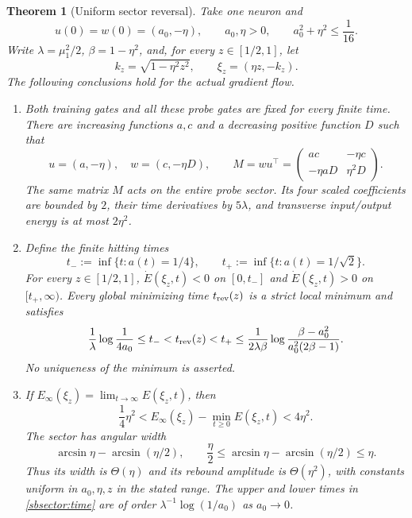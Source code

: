 \documentclass[10pt]{article}
\newtheorem{theorem}{Theorem}[section]
\theoremstyle{remark}\newtheorem{remark}[theorem]{Remark}
\begin{document}
\begin{theorem}[Uniform sector reversal]
\label{sbsector:theorem}
Take one neuron and
\[
 u(0)=w(0)=(a_0,-\eta),\qquad
 a_0,\eta>0,\qquad a_0^2+\eta^2\le\frac1{16}.
\]
Write $\lambda=\mu_1^2/2$, $\beta=1-\eta^2$, and, for every
$z\in[1/2,1]$, let
\[
 k_z=\sqrt{1-\eta^2z^2},\qquad \xi_z=(\eta z,-k_z).
\]
The following conclusions hold for the actual gradient flow.
\begin{enumerate}[label=(\roman*)]
\item Both training gates and all these probe gates are fixed for every
finite time. There are increasing functions $a,c$ and a decreasing
positive function $D$ such that
\[
 u=(a,-\eta),\quad w=(c,-\eta D),\qquad
 M=wu^\top=
 \begin{pmatrix}ac&-\eta c\\-\eta aD&\eta^2D\end{pmatrix}.
\]
The same matrix $M$ acts on the entire probe sector. Its four scaled
coefficients are bounded by $2$, their time derivatives by $5\lambda$,
and transverse input/output energy is at most $2\eta^2$.

\item Define the finite hitting times
\[
 t_-:=\inf\{t:a(t)=1/4\},\qquad
 t_+:=\inf\{t:a(t)=1/\sqrt2\}.
\]
For every $z\in[1/2,1]$, $\dot E(\xi_z,t)<0$ on $[0,t_-]$ and
$\dot E(\xi_z,t)>0$ on $[t_+,\infty)$. Every global minimizing time
$t_{\rm rev}(z)$ is a strict local minimum and satisfies
\begin{equation}\label{sbsector:time}
 \frac1\lambda\log\frac1{4a_0}
 \le t_-<t_{\rm rev}(z)<t_+
 \le\frac1{2\lambda\beta}
 \log\frac{\beta-a_0^2}{a_0^2(2\beta-1)}.
\end{equation}
No uniqueness of the minimum is asserted.

\item If $E_\infty(\xi_z)=\lim_{t\to\infty}E(\xi_z,t)$, then
\begin{equation}\label{sbsector:amplitude}
 \frac14\eta^2
 < E_\infty(\xi_z)-\min_{t\ge0}E(\xi_z,t)
 <4\eta^2.
\end{equation}
The sector has angular width
\[
 \arcsin\eta-\arcsin(\eta/2),\qquad
 \frac\eta2\le\arcsin\eta-\arcsin(\eta/2)\le\eta.
\]
Thus its width is $\Theta(\eta)$ and its rebound amplitude is
$\Theta(\eta^2)$, with constants uniform in $a_0,\eta,z$ in the stated
range. The upper and lower times in \eqref{sbsector:time} are of order
$\lambda^{-1}\log(1/a_0)$ as $a_0\to0$.
\end{enumerate}
\end{theorem}
\end{document}
